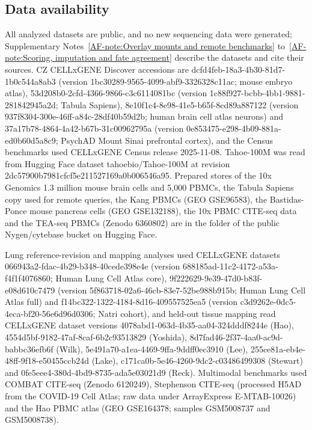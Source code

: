 \documentclass[11pt]{article}
\newcommand{\sref}[1]{\ref*{AF-#1}}
\begin{document}
\subsection*{Data availability}\label{sec:Data availability}

All analyzed datasets are public, and no new sequencing data were generated; Supplementary Notes~\sref{note:Overlay mounts and remote benchmarks} to~\sref{note:Scoring, imputation and fate agreement} describe the datasets and cite their sources. CZ CELLxGENE Discover accessions are dcfd4feb-18a3-4b30-81d7-1b0c544a8ab3 (version 1bc30289-9565-4099-abf9-3326328c11ac; mouse embryo atlas), 53d208b0-2cfd-4366-9866-c3c6114081bc (version 1c88f927-bcbb-4bb1-9881-281842945a2d; Tabula Sapiens), 8e10f1c4-8e98-41e5-b65f-8cd89a887122 (version 937f8304-300e-46ff-a84c-28df40b59d2b; human brain cell atlas neurons) and 37a17b78-4864-4a42-b67b-31c00962795a (version 0e853475-e298-4b09-881a-ed0b60d5a8c9; PsychAD Mount Sinai prefrontal cortex), and the Census benchmarks used CELLxGENE Census release 2025-11-08. Tahoe-100M was read from Hugging Face dataset tahoebio/Tahoe-100M at revision 2dc57900b7981cfcf5e211527169a0b006546a95. Prepared stores of the 10x Genomics 1.3 million mouse brain cells and 5,000 PBMCs, the Tabula Sapiens copy used for remote queries, the Kang PBMCs (GEO GSE96583), the Bastidas-Ponce mouse pancreas cells (GEO GSE132188), the 10x PBMC CITE-seq data and the TEA-seq PBMCs (Zenodo 6360802) are in the  folder of the public Nygen/cytebase bucket on Hugging Face.

Lung reference-revision and mapping analyses used CELLxGENE datasets 066943a2-fdac-4b29-b348-40cede398e4e (version 688185ad-11c2-4172-a53a-f4f1f4076860; Human Lung Cell Atlas core), 9f222629-9e39-47d0-b83f-e08d610c7479 (version 5f863718-02a6-46cb-83e7-52be988b915b; Human Lung Cell Atlas full) and f14bc322-1322-4184-8d16-409557525ea5 (version c3d9262e-0dc5-4eca-bf20-56e6d96d0306; Natri cohort), and held-out tissue mapping read CELLxGENE dataset versions 4078abd1-063d-4b35-aa04-324dddf8244e (Hao), 4554d5bf-9182-47af-8caf-6b2c93513829 (Yoshida), 8d7fad46-2f37-4aa0-ac9d-babbc36efb6f (Wilk), 5e491a70-a1ea-4469-9ffa-9ddff0ec3910 (Lee), 255ce81a-eb4e-48ff-9f18-e50455ccb24d (Lake), c171ca0b-5e46-4260-9dc2-c03486499308 (Stewart) and 0fe5eee4-380d-4bd9-8735-ada5e03021d9 (Reck). Multimodal benchmarks used COMBAT CITE-seq (Zenodo 6120249), Stephenson CITE-seq (processed H5AD  from the COVID-19 Cell Atlas; raw data under ArrayExpress E-MTAB-10026) and the Hao PBMC atlas (GEO GSE164378; samples GSM5008737 and GSM5008738).
\end{document}
